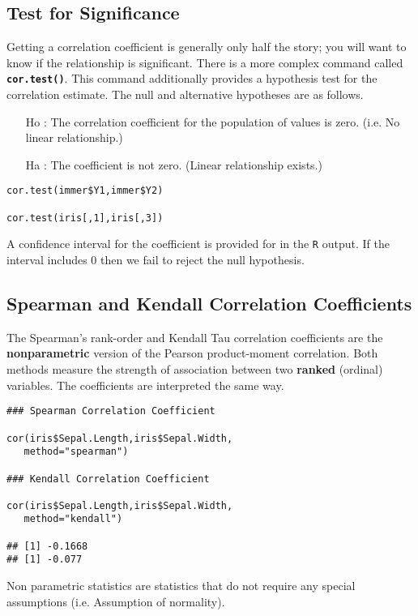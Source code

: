 \documentclass[a4paper,12pt]{article}
\begin{document}
\subsection*{Test for Significance}
Getting a correlation coefficient is generally only half the story; you will want to know if the relationship is significant. There is a more complex command called \texttt{\textbf{cor.test()}}. This command additionally provides a hypothesis test for the correlation estimate. The null and alternative hypotheses are as follows.

\begin{itemize}
	\item[Ho] : The correlation coefficient for the population of values is zero. (i.e. No linear relationship.)
	\item[Ha] : The coefficient is not zero. (Linear relationship exists.)
\end{itemize}

\begin{framed}
\begin{verbatim}
cor.test(immer$Y1,immer$Y2)

cor.test(iris[,1],iris[,3])
\end{verbatim}
\end{framed}

	


A confidence interval for the coefficient is provided for in the \texttt{R} output. If the interval includes 0 then we fail to reject the null hypothesis.

\subsection*{Spearman and Kendall Correlation Coefficients}
The Spearman's rank-order and Kendall Tau correlation coefficients are the \textbf{nonparametric} version of the Pearson product-moment correlation. Both methods measure the strength of association between two \textbf{ranked} (ordinal) variables. The coefficients are interpreted the same way.
\begin{framed}
	\begin{verbatim}
### Spearman Correlation Coefficient

cor(iris$Sepal.Length,iris$Sepal.Width, 
   method="spearman")
   
### Kendall Correlation Coefficient

cor(iris$Sepal.Length,iris$Sepal.Width, 
   method="kendall")

## [1] -0.1668
## [1] -0.077
	\end{verbatim}
\end{framed}
Non parametric statistics are statistics that do not require any special assumptions (i.e. Assumption of normality).
\end{document}
